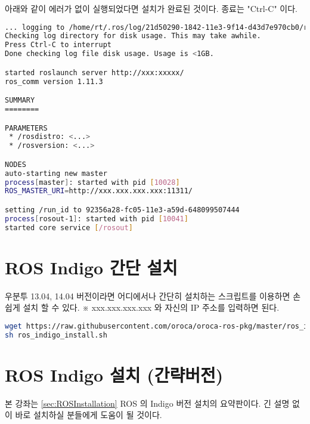 \noindent
아래와 같이 에러가 없이 실행되었다면 설치가 완료된 것이다. 종료는 "Ctrl-C" 이다.

\begin{lstlisting}[language=bash]
... logging to /home/rt/.ros/log/21d50290-1842-11e3-9f14-d43d7e970cb0/roslaunch-rt-5461.log
Checking log directory for disk usage. This may take awhile.
Press Ctrl-C to interrupt
Done checking log file disk usage. Usage is <1GB.

started roslaunch server http://xxx:xxxxx/
ros_comm version 1.11.3

SUMMARY
========

PARAMETERS
 * /rosdistro: <...>
 * /rosversion: <...>

NODES
auto-starting new master
process[master]: started with pid [10028]
ROS_MASTER_URI=http://xxx.xxx.xxx.xxx:11311/

setting /run_id to 92356a28-fc05-11e3-a59d-648099507444
process[rosout-1]: started with pid [10041]
started core service [/rosout]
\end{lstlisting}

\section{ROS Indigo 간단 설치}
\label{sec:SimpleInstallation}

우분투 13.04, 14.04 버전이라면 어디에서나 간단히 설치하는 스크립트를 이용하면 손쉽게 설치 할 수 있다. ※ xxx.xxx.xxx.xxx 와 자신의 IP 주소를 입력하면 된다.

\begin{lstlisting}[language=bash]
wget https://raw.githubusercontent.com/oroca/oroca-ros-pkg/master/ros_indigo_install.sh
sh ros_indigo_install.sh
\end{lstlisting}

\section{ROS Indigo 설치 (간략버전)}

본 강좌는 \ref{sec:ROSInstallation} ROS 의 Indigo 버전 설치의 요약판이다. 긴 설명 없이 바로 설치하실 분들에게 도움이 될 것이다.

